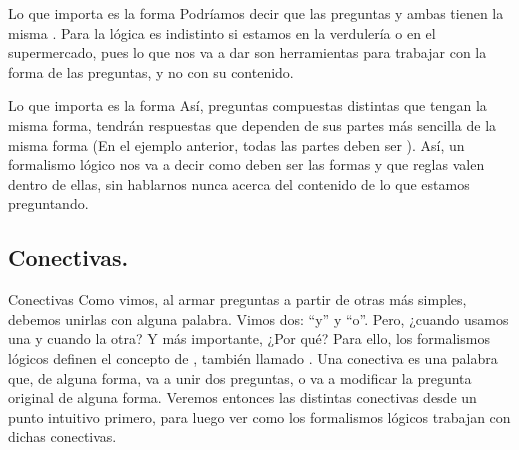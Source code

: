 
\begin{frame}{Lo que importa es la forma}
  Podríamos decir que las preguntas 
  y  ambas tienen la misma
  .
  \jump
  Para la lógica es indistinto si estamos en la verdulería o en el supermercado,
  pues lo que nos va a dar son herramientas para trabajar con la forma de las
  preguntas, y no con su contenido.
  \jump
\end{frame}


\begin{frame}{Lo que importa es la forma}
  Así, preguntas compuestas distintas que tengan la misma forma, tendrán
  respuestas que dependen de sus partes más sencilla de la misma forma
  (En el ejemplo anterior, todas las partes deben ser \fulltrue).
  \jump
  Así, un formalismo lógico nos va a decir como deben ser las formas y que
  reglas valen dentro de ellas, sin hablarnos nunca acerca del contenido de
  lo que estamos preguntando.
\end{frame}


\subsection{Conectivas.}


\begin{frame}{Conectivas}
  Como vimos, al armar preguntas a partir de otras más simples, debemos unirlas
  con alguna palabra. Vimos dos: ``y'' y ``o''.
  \jump
  Pero, ¿cuando usamos una y cuando la otra? Y más importante, ¿Por qué?
  \jump
  Para ello, los formalismos lógicos definen el concepto de ,
  también llamado . Una conectiva es una palabra que,
  de alguna forma, va a unir dos preguntas, o va a modificar la pregunta
  original de alguna forma.
  \jump
  Veremos entonces las distintas conectivas desde un punto intuitivo primero,
  para luego ver como los formalismos lógicos trabajan con dichas conectivas.
\end{frame}

